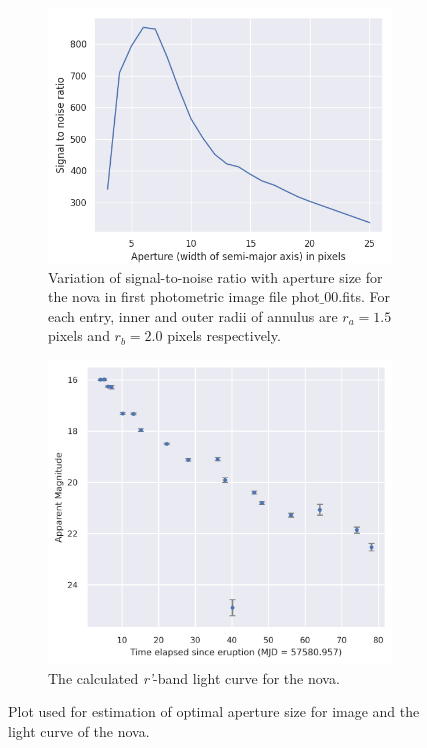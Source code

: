 \documentclass{tda}
\begin{document}
	\begin{figure}
		\begin{subfigure}{.49\textwidth}
			\centering
			\includegraphics[width=\linewidth]{../codes/plots/optimal_aperture_phot_00.png}
			\caption{Variation of signal-to-noise ratio with aperture size for the nova in first photometric image file phot\(\_\)00.fits. For each entry, inner and outer radii of annulus are \(r_a=1.5\) pixels and \(r_b=2.0\) pixels respectively.}
			\label{fig:SNR_aperture}
		\end{subfigure}%
		\hfill
		\begin{subfigure}{.49\textwidth}
			\centering
			\includegraphics[width=\linewidth]{../codes/plots/photometry_light_curve.png}
			\caption{The calculated \textit{r'}-band light curve for the nova.}
			\label{fig:light_curve}
		\end{subfigure}
		\caption{Plot used for estimation of optimal aperture size for image and the light curve of the nova.}
	\end{figure}
\end{document}
